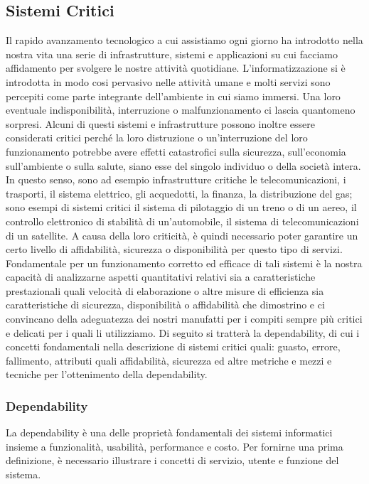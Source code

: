 \documentclass[14pt]{extarticle}
\begin{document}
\subsection{Sistemi Critici}
Il rapido avanzamento tecnologico a cui assistiamo ogni giorno ha introdotto nella nostra vita una serie di infrastrutture, sistemi e applicazioni su cui facciamo affidamento per svolgere le nostre attività quotidiane. L’informatizzazione si è introdotta in modo cosi pervasivo nelle attività umane e
molti servizi sono percepiti come parte integrante dell’ambiente in cui siamo
immersi. Una loro eventuale indisponibilità, interruzione o malfunzionamento
ci lascia quantomeno sorpresi. Alcuni di questi sistemi e infrastrutture possono inoltre essere considerati critici perché la loro distruzione o un’interruzione
del loro funzionamento potrebbe avere effetti catastrofici sulla sicurezza, sull’economia sull’ambiente o sulla salute, siano esse del singolo individuo o della
società intera. In questo senso, sono ad esempio infrastrutture critiche le telecomunicazioni, i trasporti, il sistema elettrico, gli acquedotti, la finanza, la
distribuzione del gas; sono esempi di sistemi critici il sistema di pilotaggio di
un treno o di un aereo, il controllo elettronico di stabilità di un’automobile,
il sistema di telecomunicazioni di un satellite. A causa della loro criticità, è
quindi necessario poter garantire un certo livello di affidabilità, sicurezza o
disponibilità per questo tipo di servizi.
Fondamentale per un funzionamento corretto ed efficace di tali sistemi è
la nostra capacità di analizzarne aspetti quantitativi relativi sia a caratteristiche prestazionali quali velocità di elaborazione o altre misure di efficienza
sia caratteristiche di sicurezza, disponibilità o affidabilità che dimostrino e ci
convincano della adeguatezza dei nostri manufatti per i compiti sempre più
critici e delicati per i quali li utilizziamo. Di seguito si tratterà la dependability, di cui i concetti fondamentali nella descrizione di sistemi critici quali: guasto, errore,
fallimento, attributi quali affidabilità, sicurezza ed altre metriche e mezzi e
tecniche per l’ottenimento della dependability.


\subsubsection{Dependability}
La dependability è una delle proprietà fondamentali dei sistemi informatici insieme a funzionalità, usabilità, performance e costo. Per fornirne una prima definizione, è necessario illustrare i concetti di servizio, utente e funzione del sistema.
\end{document}
